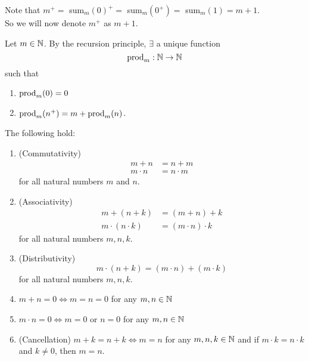 \begin{rem}
    Note that $m^{+} =$ sum$_{m}(0)^{+} = $ sum$_{m}(0^{+}) = $ sum$_{m}(1) = m + 1$. \\
    So we will now denote $m^{+}$ as $m + 1$.
\end{rem}

\begin{defn} \label{defn:N:multiplication}
    Let $m \in \mathbb{N}$. By the recursion principle, $\exists$ a unique function \[
        \mathrm{prod}_{m} : \mathbb{N} \to \mathbb{N}
    \]
    such that
    \begin{enumerate}[label=(\alph*)]
        \item\label{defn:N:multiplication:zero} $\mathrm{prod}_{m}({0}) = 0$
        \item\label{defn:N:multiplication:recursion} $\mathrm{prod}_{m}({n^{+}}) = m + \mathrm{prod}_{m}({n})$.
    \end{enumerate}
\end{defn}

\begin{thm} \label{thm:N:properties}
    The following hold:
    \begin{enumerate}[label=(\alph*)]
        \item\label{thm:N:properties:commutativity} (Commutativity)
        \begin{align*}
            m + n &= n + m \\
            m \cdot n &= n \cdot m
        \end{align*}
        for all natural numbers $m$ and $n$.

        \item\label{thm:N:properties:associativity} (Associativity)
        \begin{align*}
            m + (n + k) &= (m + n) + k \\
            m \cdot (n \cdot k) &= (m \cdot n) \cdot k
        \end{align*}
        for all natural numbers $m, n, k$.

        \item\label{thm:N:distributivity} (Distributivity) \[
            m \cdot (n + k) = (m \cdot n) + (m \cdot k)
        \] for all natural numbers $m, n, k$.
        \item\label{thm:N:m+n=0=>m=n=0} $m + n = 0 \iff m = n = 0$ for any $m, n \in \mathbb{N}$

        \item\label{thm:N:m.n=0=>m=0|n=0} $m \cdot n = 0 \iff m = 0$ or $n = 0$ for any $m, n \in \mathbb{N}$

        \item\label{thm:N:cancellation} (Cancellation) $m + k = n + k \iff m = n$ for any $m, n, k \in \mathbb{N}$ and if $m \cdot k = n \cdot k$ and $k \neq 0$, then $m = n$.
    \end{enumerate}
\end{thm}

